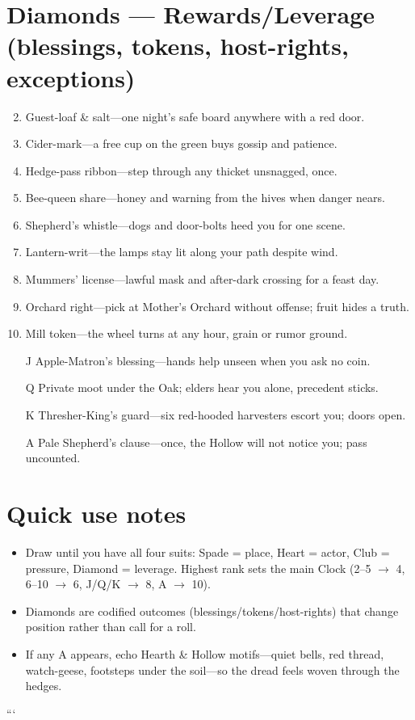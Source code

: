 \section*{Diamonds --- Rewards/Leverage (blessings, tokens, host-rights, exceptions)}
\begin{enumerate}
\setcounter{enumi}{1}
\item Guest-loaf \& salt---one night's safe board anywhere with a red door.
\item Cider-mark---a free cup on the green buys gossip and patience.
\item Hedge-pass ribbon---step through any thicket unsnagged, once.
\item Bee-queen share---honey and warning from the hives when danger nears.
\item Shepherd's whistle---dogs and door-bolts heed you for one scene.
\item Lantern-writ---the lamps stay lit along your path despite wind.
\item Mummers' license---lawful mask and after-dark crossing for a feast day.
\item Orchard right---pick at Mother's Orchard without offense; fruit hides a truth.
\item Mill token---the wheel turns at any hour, grain or rumor ground.
\item[J] Apple-Matron's blessing---hands help unseen when you ask no coin.
\item[Q] Private moot under the Oak; elders hear you alone, precedent sticks.
\item[K] Thresher-King's guard---six red-hooded harvesters escort you; doors open.
\item[A] Pale Shepherd's clause---once, the Hollow will not notice you; pass uncounted.
\end{enumerate}

\section*{Quick use notes}
\begin{itemize}
\item Draw until you have all four suits: Spade = place, Heart = actor, Club = pressure, Diamond = leverage. Highest rank sets the main Clock (2--5 $\rightarrow$ 4, 6--10 $\rightarrow$ 6, J/Q/K $\rightarrow$ 8, A $\rightarrow$ 10).
\item Diamonds are codified outcomes (blessings/tokens/host-rights) that change position rather than call for a roll.
\item If any A appears, echo Hearth \& Hollow motifs---quiet bells, red thread, watch-geese, footsteps under the soil---so the dread feels woven through the hedges.
\end{itemize}
```
